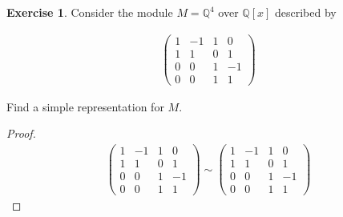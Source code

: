 \documentclass[12pt]{extarticle}
\newcommand{\Q}{\mathbb{Q}}
\newcommand{\<}{\langle}
\renewcommand{\>}{\rangle}
\theoremstyle{definition}
\newtheorem{exercise}{Exercise}
\begin{document}
\begin{exercise}
  Consider the module $M = \Q^4$ over $\Q[x]$ described by
  \begin{center}
    \begin{align*}
      \begin{pmatrix}
        1 & -1 & 1 & 0 \\
        1 & 1 & 0 & 1 \\
        0 & 0 & 1 & -1 \\
        0 & 0 & 1 & 1
      \end{pmatrix}
    \end{align*}
  \end{center}
  Find a simple representation for $M$.
\end{exercise}
\begin{proof}
  \begin{align*}
    \begin{pmatrix}
      1 & -1 & 1 & 0 \\
      1 & 1 & 0 & 1 \\
      0 & 0 & 1 & -1 \\
      0 & 0 & 1 & 1
    \end{pmatrix}
    \sim
    \begin{pmatrix}
      1 & -1 & 1 & 0 \\
      1 & 1 & 0 & 1 \\
      0 & 0 & 1 & -1 \\
      0 & 0 & 1 & 1
    \end{pmatrix}
  \end{align*}
\end{proof}
\end{document}
